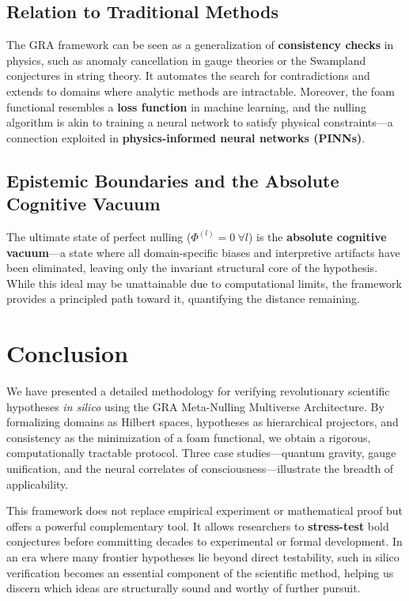 \documentclass[11pt,a4paper]{article}
\begin{document}
\subsection{Relation to Traditional Methods}
The GRA framework can be seen as a generalization of \textbf{consistency checks} in physics, such as anomaly cancellation in gauge theories or the Swampland conjectures in string theory. It automates the search for contradictions and extends to domains where analytic methods are intractable. Moreover, the foam functional resembles a \textbf{loss function} in machine learning, and the nulling algorithm is akin to training a neural network to satisfy physical constraints—a connection exploited in \textbf{physics-informed neural networks (PINNs)}.

\subsection{Epistemic Boundaries and the Absolute Cognitive Vacuum}
The ultimate state of perfect nulling (\(\Phi^{(l)}=0 \ \forall l\)) is the \textbf{absolute cognitive vacuum}—a state where all domain-specific biases and interpretive artifacts have been eliminated, leaving only the invariant structural core of the hypothesis. While this ideal may be unattainable due to computational limits, the framework provides a principled path toward it, quantifying the distance remaining.

\section{Conclusion}
We have presented a detailed methodology for verifying revolutionary scientific hypotheses \emph{in silico} using the GRA Meta-Nulling Multiverse Architecture. By formalizing domains as Hilbert spaces, hypotheses as hierarchical projectors, and consistency as the minimization of a foam functional, we obtain a rigorous, computationally tractable protocol. Three case studies—quantum gravity, gauge unification, and the neural correlates of consciousness—illustrate the breadth of applicability.

This framework does not replace empirical experiment or mathematical proof but offers a powerful complementary tool. It allows researchers to \textbf{stress-test} bold conjectures before committing decades to experimental or formal development. In an era where many frontier hypotheses lie beyond direct testability, such in silico verification becomes an essential component of the scientific method, helping us discern which ideas are structurally sound and worthy of further pursuit.
\end{document}
